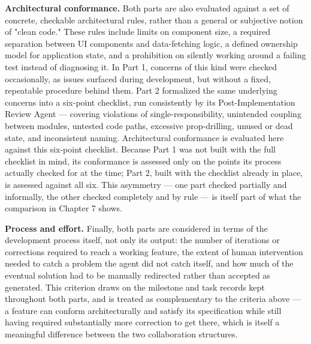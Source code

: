 \textbf{Architectural conformance.} Both parts are also evaluated against a set of concrete, checkable architectural rules, rather than a general or subjective notion of "clean code." These rules include limits on component size, a required separation between UI components and data-fetching logic, a defined ownership model for application state, and a prohibition on silently working around a failing test instead of diagnosing it. In Part 1, concerns of this kind were checked occasionally, as issues surfaced during development, but without a fixed, repeatable procedure behind them. Part 2 formalized the same underlying concerns into a six-point checklist, run consistently by its Post-Implementation Review Agent --- covering violations of single-responsibility, unintended coupling between modules, untested code paths, excessive prop-drilling, unused or dead state, and inconsistent naming. Architectural conformance is evaluated here against this six-point checklist. Because Part 1 was not built with the full checklist in mind, its conformance is assessed only on the points its process actually checked for at the time; Part 2, built with the checklist already in place, is assessed against all six. This asymmetry --- one part checked partially and informally, the other checked completely and by rule --- is itself part of what the comparison in Chapter 7 shows.

\textbf{Process and effort.} Finally, both parts are considered in terms of the development process itself, not only its output: the number of iterations or corrections required to reach a working feature, the extent of human intervention needed to catch a problem the agent did not catch itself, and how much of the eventual solution had to be manually redirected rather than accepted as generated. This criterion draws on the milestone and task records kept throughout both parts, and is treated as complementary to the criteria above --- a feature can conform architecturally and satisfy its specification while still having required substantially more correction to get there, which is itself a meaningful difference between the two collaboration structures.

